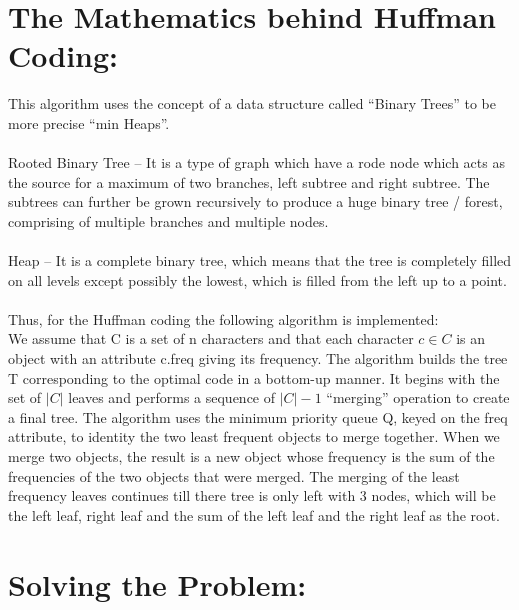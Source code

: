 \documentclass{article}
\begin{document}
\vspace{1cm}

\section{The Mathematics behind Huffman Coding:} 

\vspace{.4cm}

\Large{This algorithm uses the concept of a data structure called “Binary Trees” to be more precise “min Heaps”. \\ \\
Rooted Binary Tree – It is a type of graph which have a rode node which acts as the source for a maximum of two branches, left subtree and right subtree. The subtrees can further be grown recursively to produce a huge binary tree / forest, comprising of multiple branches and multiple nodes. \\ \\
Heap – It is a complete binary tree, which means that the tree is completely filled on all levels except possibly the lowest, which is filled from the left up to a point. \\ \\
Thus, for the Huffman coding the following algorithm is implemented: \\

We assume that C is a set of n characters and that each character $c \in C$ is an object with an attribute c.freq giving its frequency. The algorithm builds the tree T corresponding to the optimal code in a bottom-up manner. It begins with the set of $|C|$ leaves and performs a sequence of $|C| - 1$ “merging” operation to create a final tree. The algorithm uses the minimum priority queue Q, keyed on the freq attribute, to identity the two least frequent objects to merge together. When we merge two objects, the result is a new object whose frequency is the sum of the frequencies of the two objects that were merged. The merging of the least frequency leaves continues till there tree is only left with 3 nodes, which will be the left leaf, right leaf and the sum of the left leaf and the right leaf as the root.
}

\vspace{1cm}

\section{Solving the Problem:}
\end{document}
